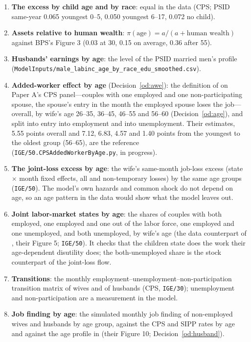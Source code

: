 \documentclass[11pt]{article}
\newcommand{\code}[1]{\texttt{#1}}
\newcommand{\1}{\mathbf{1}}
\begin{document}
\begin{enumerate}
  \item \textbf{The excess by child age and by race}: equal in the data (CPS; PSID same-year 0.065 youngest 0--5, 0.050
  youngest 6--17, 0.072 no child).
  \item \textbf{Assets relative to human wealth}: $\pi(\text{age}) = a/(a + \text{human wealth})$ against BPS's Figure 3
  (0.03 at 30, 0.15 on average, 0.36 after 55).
  \item \textbf{Husbands' earnings by age}: the level of the PSID married men's profile
  (\code{ModelInputs/}\allowbreak\code{male\_labinc\_age\_by\_}\allowbreak\code{race\_edu\_smoothed.csv}).
  \item \textbf{Added-worker effect by age} (Decision~\ref{od:awe}): the definition of \citet{bacher2025joint} on Paper
  A's CPS panel---couples with one employed and one non-participating spouse, the spouse's entry in the month the
  employed spouse loses the job---overall, by wife's age 26--35, 36--45, 46--55 and 56--60 (Decision~\ref{od:age}), and
  split into entry into employment and into unemployment. Their estimates, 5.55 points overall and 7.12, 6.83, 4.57 and
  1.40 points from the youngest to the oldest group (56--65), are the reference (\code{IGE/50.CPSAddedWorkerByAge.py}, in
  progress).
  \item \textbf{The joint-loss excess by age}: the wife's same-month job-loss excess (state $\times$ month fixed effects,
  all and non-temporary losses) by the same age groups (\code{IGE/50}). The model's own hazards and common shock do not
  depend on age, so an age pattern in the data would show what the model leaves out.
  \item \textbf{Joint labor-market states by age}: the shares of couples with both employed, one employed and one out of
  the labor force, one employed and one unemployed, and both unemployed, by wife's age (the data counterpart of
  \citealp{bacher2025joint}, their Figure 5; \code{IGE/50}). It checks that the children state does the work their
  age-dependent disutility does; the both-unemployed share is the stock counterpart of the joint-loss flow.
  \item \textbf{Transitions}: the monthly employment--unemployment--non-participation transition matrix of wives and of
  husbands (CPS, \code{IGE/30}); unemployment and non-participation are a measurement in the model.
  \item \textbf{Job finding by age}: the simulated monthly job finding of non-employed wives and husbands by age group,
  against the CPS and SIPP rates by age and against the age profile in \citet{bacher2025joint} (their Figure 10;
  Decision~\ref{od:husband}).
\end{enumerate}
\end{document}
